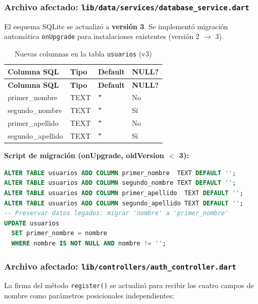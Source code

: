 \documentclass[12pt,a4paper]{article}
\begin{document}
\subsubsection{Archivo afectado: \texttt{lib/data/services/database\_service.dart}}

El esquema SQLite se actualizó a \textbf{versión 3}. Se implementó migración automática
\texttt{onUpgrade} para instalaciones existentes (versión 2 $\rightarrow$ 3).

\begin{longtable}{>{\ttfamily}p{4.5cm} p{3.5cm} p{2.5cm} p{2.5cm}}
\caption{Nuevas columnas en la tabla \texttt{usuarios} (v3)} \label{tab:columnas-db} \\
\toprule
\textbf{Columna SQL} & \textbf{Tipo} & \textbf{Default} & \textbf{NULL?} \\
\midrule
\endfirsthead
\toprule
\textbf{Columna SQL} & \textbf{Tipo} & \textbf{Default} & \textbf{NULL?} \\
\midrule
\endhead
\bottomrule
\endlastfoot
primer\_nombre  & TEXT & \texttt{''} & No \\
segundo\_nombre & TEXT & \texttt{''} & Sí \\
primer\_apellido& TEXT & \texttt{''} & No \\
segundo\_apellido& TEXT & \texttt{''} & Sí \\
\end{longtable}

\textbf{Script de migración (onUpgrade, oldVersion $<$ 3):}
\begin{lstlisting}[language=SQL, caption={Migración v2 -> v3 en SQLite}]
ALTER TABLE usuarios ADD COLUMN primer_nombre  TEXT DEFAULT '';
ALTER TABLE usuarios ADD COLUMN segundo_nombre TEXT DEFAULT '';
ALTER TABLE usuarios ADD COLUMN primer_apellido  TEXT DEFAULT '';
ALTER TABLE usuarios ADD COLUMN segundo_apellido TEXT DEFAULT '';
-- Preservar datos legados: migrar 'nombre' a 'primer_nombre'
UPDATE usuarios
  SET primer_nombre = nombre
  WHERE nombre IS NOT NULL AND nombre != '';
\end{lstlisting}

\subsubsection{Archivo afectado: \texttt{lib/controllers/auth\_controller.dart}}

La firma del método \texttt{register()} se actualizó para recibir los cuatro campos de nombre
como parámetros posicionales independientes:
\end{document}
